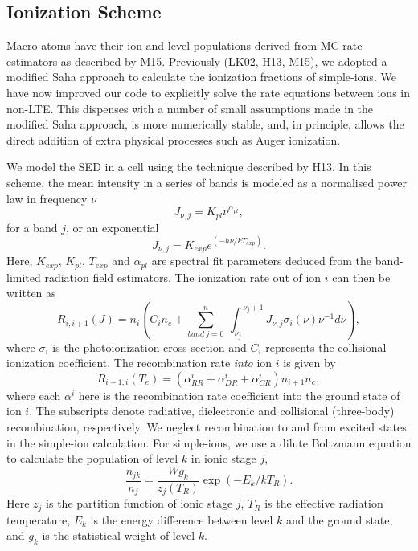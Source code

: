 \documentclass[preprint, a4paper, 11pt]{aastex}
\begin{document}
\subsection{Ionization Scheme}

Macro-atoms have their ion and level populations derived from
MC rate estimators as described by M15. Previously (LK02, H13, M15),
we adopted a modified Saha approach to calculate the ionization fractions
of simple-ions. We have now improved our code to explicitly solve the 
rate equations between ions in non-LTE. 
This dispenses with a number of small assumptions made in the modified Saha approach, 
is more numerically stable, 
and, in principle, allows the direct addition of extra physical 
processes such as Auger ionization.

We model the SED in a cell using the technique described by H13. In this scheme,
the mean intensity in a series of bands is modeled as a normalised power law in 
frequency $\nu$
\begin{equation}
J_{\nu,j}=K_{pl}\nu^{\alpha_{pl}},
\end{equation}
for a band $j$, or an exponential 
\begin{equation}
J_{\nu,j}=K_{exp} e^{(-h\nu/k T_{exp})}.
\end{equation}
Here, $K_{exp}$, $K_{pl}$, $T_{exp}$ and $\alpha_{pl}$ are spectral fit parameters
deduced from the band-limited radiation field estimators.
The ionization rate out of ion $i$ can then be written as 
\begin{equation}
R_{i,i+1}(J)= 
\displaystyle{
n_i \left(C_{i} n_e + 
\sum_{band~j=0}^{n}~
{\int_{\nu_j}^{~\nu_j+1}{J_{\nu,j}\sigma_i(\nu)\nu^{-1}d\nu}}
\right),}
\end{equation}
where $\sigma_i$ is the photoionization cross-section and $C_{i}$
represents the collisional ionization coefficient.
The recombination rate {\em into} ion $i$ is given by 
\begin{equation}
R_{i+1,i}(T_e) = (\alpha^i_{RR} + \alpha^i_{DR} + \alpha^i_{CR}) n_{i+1} n_e,
\end{equation}
where each $\alpha^i$ here is the recombination rate coefficient into the ground state of ion $i$.
The subscripts denote radiative, dielectronic and 
collisional (three-body) recombination, respectively.
We neglect recombination to and from excited states in the simple-ion calculation. 
For simple-ions, we use a dilute Boltzmann equation to calculate 
the population of level $k$ in ionic stage $j$,
\begin{equation}
\frac{n_{jk}}{n_j} = \frac{W g_k}{z_j(T_R)} \exp(-E_k/kT_R).
\end{equation}
Here $z_j$ is the partition function of ionic stage $j$,
$T_R$ is the effective radiation temperature,
$E_k$ is the energy difference between level $k$ and the ground state,
and $g_k$ is the statistical weight of level $k$. 
\end{document}

